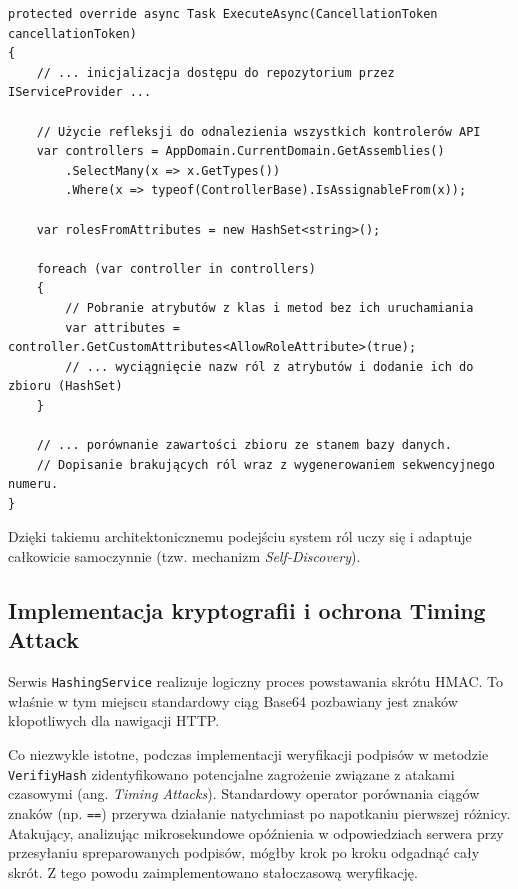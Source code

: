 \documentclass{SGGW-thesis}
\begin{document}
\begin{verbatim}
protected override async Task ExecuteAsync(CancellationToken cancellationToken)
{
    // ... inicjalizacja dostępu do repozytorium przez IServiceProvider ...
    
    // Użycie refleksji do odnalezienia wszystkich kontrolerów API
    var controllers = AppDomain.CurrentDomain.GetAssemblies()
        .SelectMany(x => x.GetTypes())
        .Where(x => typeof(ControllerBase).IsAssignableFrom(x));

    var rolesFromAttributes = new HashSet<string>();

    foreach (var controller in controllers)
    {
        // Pobranie atrybutów z klas i metod bez ich uruchamiania
        var attributes = controller.GetCustomAttributes<AllowRoleAttribute>(true);
        // ... wyciągnięcie nazw ról z atrybutów i dodanie ich do zbioru (HashSet)
    }
    
    // ... porównanie zawartości zbioru ze stanem bazy danych.
    // Dopisanie brakujących ról wraz z wygenerowaniem sekwencyjnego numeru.
}
\end{verbatim}

Dzięki takiemu architektonicznemu podejściu system ról uczy się i adaptuje całkowicie samoczynnie (tzw. mechanizm \textit{Self-Discovery}).

\subsection{Implementacja kryptografii i ochrona Timing Attack}

Serwis \texttt{HashingService} realizuje logiczny proces powstawania skrótu HMAC. To właśnie w tym miejscu standardowy ciąg Base64 pozbawiany jest znaków kłopotliwych dla nawigacji HTTP.

Co niezwykle istotne, podczas implementacji weryfikacji podpisów w metodzie \texttt{VerifiyHash} zidentyfikowano potencjalne zagrożenie związane z atakami czasowymi (ang. \textit{Timing Attacks}). Standardowy operator porównania ciągów znaków (np. \texttt{==}) przerywa działanie natychmiast po napotkaniu pierwszej różnicy. Atakujący, analizując mikrosekundowe opóźnienia w odpowiedziach serwera przy przesyłaniu spreparowanych podpisów, mógłby krok po kroku odgadnąć cały skrót. Z tego powodu zaimplementowano stałoczasową weryfikację.
\end{document}
